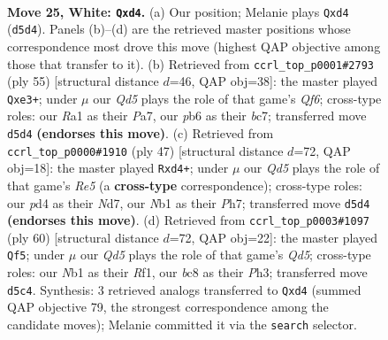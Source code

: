 \documentclass[11pt]{article}
\begin{document}
\clearpage

\begin{figure}[p]\centering
\begin{subfigure}{0.46\textwidth}\centering
\resizebox{\linewidth}{!}{%
\newchessgame
\chessboard[
  setfen={1rb4r/4k1pp/1p6/p2Q4/3p3P/8/PP3PP1/RN4K1 w - - 0 25},
  showmover=false,
  pgfstyle=straightmove, color=movearrow, markmove={d5-d4}
]}
\caption{}
\end{subfigure}\hfill
\begin{subfigure}{0.46\textwidth}\centering
\resizebox{\linewidth}{!}{%
\newchessgame
\chessboard[
  setfen={6k1/ppB2pp1/7p/8/P7/4PqPP/8/R1R3K1 b - - 0 28},
  showmover=false,
  pgfstyle=straightmove, color=movearrow, markmove={f3-e3}
]}
\caption{}
\end{subfigure}
\\[4pt]
\begin{subfigure}{0.46\textwidth}\centering
\resizebox{\linewidth}{!}{%
\newchessgame
\chessboard[
  setfen={6k1/3n1ppp/1p2p3/1B6/3Pr3/P7/1P1K2PP/7R b - - 0 24},
  showmover=false,
  pgfstyle=straightmove, color=movearrow, markmove={e4-d4}
]}
\caption{}
\end{subfigure}\hfill
\begin{subfigure}{0.46\textwidth}\centering
\resizebox{\linewidth}{!}{%
\newchessgame
\chessboard[
  setfen={1r5k/2q2pp1/7p/1p1Q4/5P2/1P5P/6P1/5R1K w - - 0 31},
  showmover=false,
  pgfstyle=straightmove, color=movearrow, markmove={d5-f5}
]}
\caption{}
\end{subfigure}
\caption{\textbf{Move 25, White: \texttt{Qxd4}.} (a) Our position; Melanie plays \texttt{Qxd4} (\texttt{d5d4}). Panels (b)--(d) are the retrieved master positions whose correspondence most drove this move (highest QAP objective among those that transfer to it). (b) Retrieved from \texttt{ccrl\_top\_p0001\#2793} (ply 55) [structural distance $d$=46, QAP obj=38]: the master played \texttt{Qxe3+}; under $\mu$ our \emph{Qd5} plays the role of that game's \emph{Qf6}; cross-type roles: our \emph{R}a1 as their \emph{P}a7, our \emph{p}b6 as their \emph{b}c7; transferred move \texttt{d5d4} \textbf{(endorses this move)}. (c) Retrieved from \texttt{ccrl\_top\_p0000\#1910} (ply 47) [structural distance $d$=72, QAP obj=18]: the master played \texttt{Rxd4+}; under $\mu$ our \emph{Qd5} plays the role of that game's \emph{Re5} (a \textbf{cross-type} correspondence); cross-type roles: our \emph{p}d4 as their \emph{N}d7, our \emph{N}b1 as their \emph{P}h7; transferred move \texttt{d5d4} \textbf{(endorses this move)}. (d) Retrieved from \texttt{ccrl\_top\_p0003\#1097} (ply 60) [structural distance $d$=72, QAP obj=22]: the master played \texttt{Qf5}; under $\mu$ our \emph{Qd5} plays the role of that game's \emph{Qd5}; cross-type roles: our \emph{N}b1 as their \emph{R}f1, our \emph{b}c8 as their \emph{P}h3; transferred move \texttt{d5c4}. Synthesis: 3 retrieved analogs transferred to \texttt{Qxd4} (summed QAP objective 79, the strongest correspondence among the candidate moves); Melanie committed it via the \texttt{search} selector.}
\label{fig:thought-m48}
\end{figure}
\end{document}
